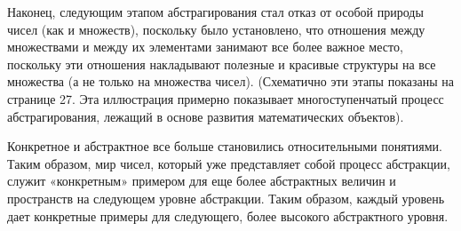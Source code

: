 Наконец, следующим этапом абстрагирования стал отказ от особой природы чисел (как и множеств), поскольку было установлено, что отношения между множествами и между их элементами занимают все более важное место, поскольку эти отношения накладывают полезные и красивые структуры на все множества (а не только на множества чисел). (Схематично эти этапы показаны на странице 27. Эта иллюстрация примерно показывает многоступенчатый процесс абстрагирования, лежащий в основе развития математических объектов).

Конкретное и абстрактное все больше становились относительными понятиями. Таким образом, мир чисел, который уже представляет собой процесс абстракции, служит «конкретным» примером для еще более абстрактных величин и пространств на следующем уровне абстракции. Таким образом, каждый уровень дает конкретные примеры для следующего, более высокого абстрактного уровня.